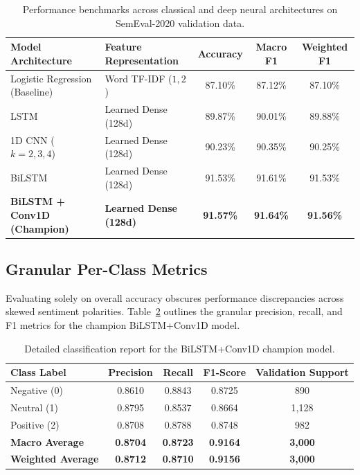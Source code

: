 \documentclass[11pt,a4paper]{article}
\begin{document}
\begin{table}[h]
\centering
\small
\begin{tabular}{llccc}
\toprule
\textbf{Model Architecture} & \textbf{Feature Representation} & \textbf{Accuracy} & \textbf{Macro F1} & \textbf{Weighted F1} \\
\midrule
Logistic Regression (Baseline) & Word TF-IDF ($1, 2$)      & 87.10\% & 87.12\% & 87.10\% \\
LSTM                          & Learned Dense (128d)      & 89.87\% & 90.01\% & 89.88\% \\
1D CNN ($k=2,3,4$)            & Learned Dense (128d)      & 90.23\% & 90.35\% & 90.25\% \\
BiLSTM                        & Learned Dense (128d)      & 91.53\% & 91.61\% & 91.53\% \\
\textbf{BiLSTM + Conv1D (Champion)} & \textbf{Learned Dense (128d)} & \textbf{91.57\%} & \textbf{91.64\%} & \textbf{91.56\%} \\
\bottomrule
\end{tabular}
\caption{Performance benchmarks across classical and deep neural architectures on SemEval-2020 validation data.}
\label{tab:model_results}
\end{table}

\subsection{Granular Per-Class Metrics}
Evaluating solely on overall accuracy obscures performance discrepancies across skewed sentiment polarities. Table~\ref{tab:per_class} outlines the granular precision, recall, and F1 metrics for the champion BiLSTM+Conv1D model.

\begin{table}[h]
\centering
\small
\begin{tabular}{lcccc}
\toprule
\textbf{Class Label} & \textbf{Precision} & \textbf{Recall} & \textbf{F1-Score} & \textbf{Validation Support} \\
\midrule
Negative (0)  & 0.8610 & 0.8843 & 0.8725 & 890 \\
Neutral (1)   & 0.8795 & 0.8537 & 0.8664 & 1,128 \\
Positive (2)  & 0.8708 & 0.8788 & 0.8748 & 982 \\
\midrule
\textbf{Macro Average}    & \textbf{0.8704} & \textbf{0.8723} & \textbf{0.9164} & \textbf{3,000} \\
\textbf{Weighted Average} & \textbf{0.8712} & \textbf{0.8710} & \textbf{0.9156} & \textbf{3,000} \\
\bottomrule
\end{tabular}
\caption{Detailed classification report for the BiLSTM+Conv1D champion model.}
\label{tab:per_class}
\end{table}
\end{document}
